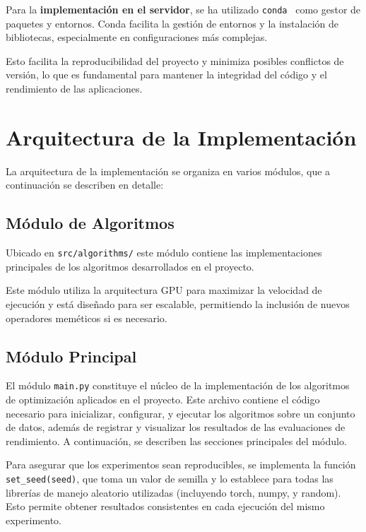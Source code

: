 Para la \textbf{implementación en el servidor}, se ha utilizado \texttt{conda}~\cite{noauthor_conda_nodate} como gestor
de paquetes y entornos.
Conda facilita la gestión de entornos y la instalación de bibliotecas, especialmente en configuraciones más complejas.



Esto facilita la reproducibilidad del proyecto y minimiza posibles conflictos de versión, lo que es fundamental para
mantener la integridad del código y el rendimiento de las aplicaciones.

\section{Arquitectura de la Implementación}\label{sec:arquitectura-de-la-implementacion}
La arquitectura de la implementación se organiza en varios módulos, que a continuación se describen en detalle:

\subsection{Módulo de Algoritmos}\label{subsec:modulo-de-algoritmos}
Ubicado en \texttt{src/algorithms/} este módulo contiene las implementaciones principales de los
algoritmos desarrollados en el proyecto.

Este módulo utiliza la arquitectura GPU para maximizar la velocidad de ejecución y está diseñado para ser escalable,
permitiendo la inclusión de nuevos operadores meméticos si es necesario.

\subsection{Módulo Principal}\label{subsec:modulo-principal}
El módulo \texttt{main.py} constituye el núcleo de la implementación de los algoritmos de optimización aplicados en el
proyecto.
Este archivo contiene el código necesario para inicializar, configurar, y ejecutar los algoritmos sobre un conjunto de
datos, además de registrar y visualizar los resultados de las evaluaciones de rendimiento.
A continuación, se describen las secciones principales del módulo.


Para asegurar que los experimentos sean reproducibles, se implementa la función \texttt{set\_seed(seed)}, que toma un
valor de semilla y lo establece para todas las librerías de manejo aleatorio utilizadas (incluyendo torch, numpy, y
random).
Esto permite obtener resultados consistentes en cada ejecución del mismo experimento.


